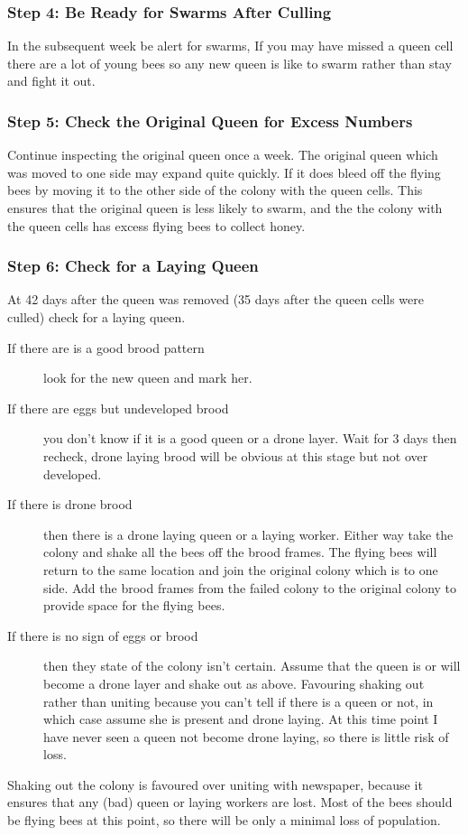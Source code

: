 \subsubsection*{Step 4: Be Ready for Swarms After Culling}

In the subsequent week be alert for swarms,
If you may have missed a queen cell there are a lot of young bees
so any new queen is like to swarm rather than stay and fight it out.

\subsubsection*{Step 5: Check the Original Queen for Excess Numbers}

Continue inspecting the original queen once a week.
The original queen which was moved to one side may expand quite quickly.
If it does bleed off the flying bees by moving it to the other side of the colony with the queen cells.
This ensures that the original queen is less likely to swarm,
and the the colony with the queen cells has excess flying bees to collect honey.

\subsubsection*{Step 6: Check for a Laying Queen}

At 42 days after the queen was removed
(35 days after the queen cells were culled)
check for a laying queen.

\begin{description}
  \item [If there are is a good brood pattern] look for the new queen and mark her.
  \item [If there are eggs but undeveloped brood] you don't know if it is a good queen or a drone layer.
    Wait for 3 days then recheck, drone laying brood will be obvious at this stage but not over developed.
  \item [If there is drone brood] then there is a drone laying queen or a laying worker.
    Either way take the colony and shake all the bees off the brood frames.
    The flying bees will return to the same location and join the original colony which is to one side.
    Add the brood frames from the failed colony to the original colony to provide space for the flying bees.
  \item [If there is no sign of eggs or brood] then they state of the colony isn't certain.
    Assume that the queen is or will become a drone layer and shake out as above.
    Favouring shaking out rather than uniting because you can't tell if there is a queen or not,
    in which case assume she is present and drone laying.
    At this time point I have never seen a queen not become drone laying,
    so there is little risk of loss.
\end{description}

Shaking out the colony is favoured over uniting with newspaper,
because it ensures that any (bad) queen or laying workers are lost.
Most of the bees should be flying bees at this point,
so there will be only a minimal loss of population.
